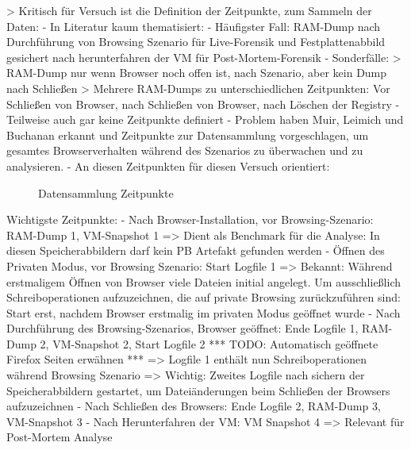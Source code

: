 > Kritisch für Versuch ist die Definition der Zeitpunkte, zum Sammeln der Daten:
	- In Literatur kaum thematisiert:
		- Häufigster Fall: RAM-Dump nach Durchführung von Browsing Szenario für Live-Forensik \cite{Hariharan.2022, Izzati.2022, Md.2018, Ohana.2013} und Festplattenabbild gesichert nach herunterfahren der VM für Post-Mortem-Forensik \cite{Fayyad.2021, Mahlous.2020, Horsman.2019, Md.2018, Gabet.2018, Montasari.2015, Chivers.2014, Ohana.2013}
		- Sonderfälle: 
			> RAM-Dump nur wenn Browser noch offen ist, nach Szenario, aber kein Dump nach Schließen \cite{Mahlous.2020}
			> Mehrere RAM-Dumps zu unterschiedlichen Zeitpunkten: Vor Schließen von Browser, nach Schließen von Browser, nach Löschen der Registry \cite{Rochmadi.2017}
		- Teilweise auch gar keine Zeitpunkte definiert \cite{Sajan.2021, Nalawade.2016, Montasari.2015, Satvat.2014, Said.2011, Aggarwal.2010}
	- Problem haben Muir, Leimich und Buchanan erkannt und Zeitpunkte zur Datensammlung vorgeschlagen, um gesamtes Browserverhalten während des Szenarios zu überwachen und zu analysieren.
	- An diesen Zeitpunkten für diesen Versuch orientiert:
		\begin{figure}[h!]
			\centering
			\small
			\centerline{\resizebox{\linewidth}{!}{}}
			\caption{Datensammlung Zeitpunkte}
			\label{fig:jes}
		\end{figure}
	Wichtigste Zeitpunkte:
		- Nach Browser-Installation, vor Browsing-Szenario: RAM-Dump 1, VM-Snapshot 1 
			=> Dient als Benchmark für die Analyse: In diesen Speicherabbildern darf kein PB Artefakt gefunden werden
		- Öffnen des Privaten Modus, vor Browsing Szenario: Start Logfile 1
			=> Bekannt: Während erstmaligem Öffnen von Browser viele Dateien initial angelegt. Um ausschließlich Schreiboperationen aufzuzeichnen, die auf private Browsing zurückzuführen sind: Start erst, nachdem Browser erstmalig im privaten Modus geöffnet wurde
		- Nach Durchführung des Browsing-Szenarios, Browser geöffnet: Ende Logfile 1, RAM-Dump 2, VM-Snapshot 2, Start Logfile 2
			*** TODO: Automatisch geöffnete Firefox Seiten erwähnen ***
			=> Logfile 1 enthält nun Schreiboperationen während Browsing Szenario
			=> Wichtig: Zweites Logfile nach sichern der Speicherabbildern gestartet, um Dateiänderungen beim Schließen der Browsers aufzuzeichnen
		- Nach Schließen des Browsers: Ende Logfile 2, RAM-Dump 3, VM-Snapshot 3
		- Nach Herunterfahren der VM: VM Snapshot 4
			=> Relevant für Post-Mortem Analyse

